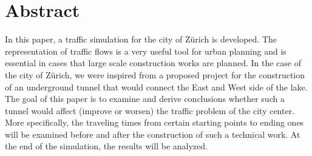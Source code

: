 \documentclass[11pt]{article}
\begin{document}

\newpage
















\newpage








\tableofcontents

\newpage




\section{Abstract}
In this paper, a traffic simulation for the city of Z\"urich is developed. The representation of traffic flows is a very useful tool for urban planning and is essential in cases that large scale construction works are planned. In the case of the city of Z\"urich, we were inspired from a proposed project for the construction of an underground tunnel that would connect the East and West side of the lake. The goal of this paper is to examine and derive conclusions whether such a tunnel would affect (improve or worsen) the traffic problem of the city center. More specifically, the traveling times from certain starting points to ending ones will be examined before and after the construction of such a technical work. At the end of the simulation, the results will be analyzed.
\end{document}
